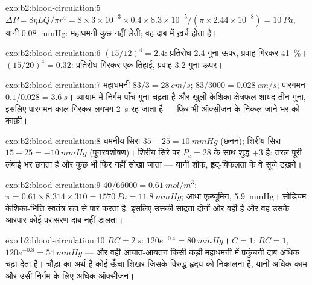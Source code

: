 \begin{solution}{exo:b2:blood-circulation:5}
$\Delta P = 8\eta LQ/\pi r^{4} = 8\times 3\times 10^{-3}\times
0.4\times 8.3\times 10^{-5}/(\pi\times 2.44\times 10^{-8}) =
\qty{10}{Pa}$, यानी \qty{0.08}{mmHg}: महाधमनी कुछ नहीं लेती; वह
दाब  में ख़र्च होता है।
\end{solution}

\begin{solution}{exo:b2:blood-circulation:6}
$(15/12)^{4} = 2.4$: प्रतिरोध 2.4 गुना ऊपर, प्रवाह गिरकर
\qty{41}{\%}। $(15/20)^{4} = 0.32$: प्रतिरोध गिरकर एक तिहाई, प्रवाह
3.2 गुना ऊपर।
\end{solution}

\begin{solution}{exo:b2:blood-circulation:7}
महाधमनी $83/3 = \qty{28}{cm/s}$;  $83/3000 =
\qty{0.028}{cm/s}$; पारगमन $0.1/0.028 = \qty{3.6}{s}$। व्यायाम में
निर्गम पाँच गुना चढ़ता है और खुली केशिका-क्षेत्रफल शायद
तीन गुना, इसलिए पारगमन-काल गिरकर लगभग \qty{2}{s} रह जाता है --- फिर भी
ऑक्सीजन के निकल जाने भर को काफ़ी।
\end{solution}

\begin{solution}{exo:b2:blood-circulation:8}
धमनीय सिरा $35 - 25 = \qty{+10}{mmHg}$ (छनन); शिरीय सिरा $15
- 25 = \qty{-10}{mmHg}$ (पुनरवशोषण)। शिरीय सिरे पर $P_c = 28$ के साथ
शुद्ध $+3$ है: तरल पूरी लंबाई भर छनता है और कुछ भी
फिर नहीं सोखा जाता --- यानी शोफ, हृद्-विफलता के वे सूजे टख़ने।
\end{solution}

\begin{solution}{exo:b2:blood-circulation:9}
$40/66000 = \qty{0.61}{mol/m^3}$; $\pi = 0.61\times 8.314\times 310 =
\qty{1570}{Pa} = \qty{11.8}{mmHg}$; आधा एल्ब्यूमिन, \qty{5.9}{mmHg}।
सोडियम केशिका-भित्ति स्वतंत्र रूप से पार करता है, इसलिए उसकी सांद्रता दोनों
ओर वही है और वह उसके आरपार कोई परासरण दाब नहीं डालता।
\end{solution}

\begin{solution}{exo:b2:blood-circulation:10}
$RC = \qty{2}{s}$: $120e^{-0.4} = \qty{80}{mmHg}$। $C = 1$: $RC = 1$,
$120e^{-0.8} = \qty{54}{mmHg}$ --- और वही आघात-आयतन किसी कड़ी महाधमनी में
प्रकुंचनी दाब अधिक चढ़ा देता है। चौड़ा 
का अर्थ है कोई ऊँचा शिखर जिसके विरुद्ध हृदय को निकालना है, यानी अधिक काम
और उसी निर्गम के लिए अधिक ऑक्सीजन।
\end{solution}

